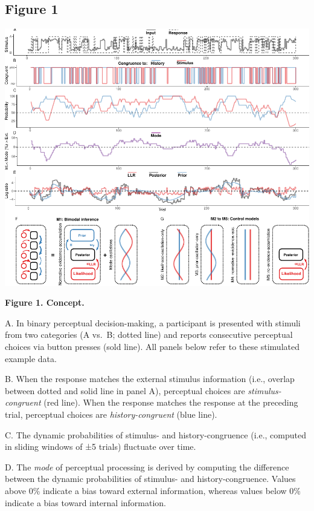 \documentclass[
]{article}
\begin{document}
\hypertarget{figure-1}{%
\subsection{Figure 1}\label{figure-1}}

\includegraphics{modes_mouse_rev1b_files/figure-latex/revised_Figure_1-1.pdf}

\textbf{Figure 1. Concept.}

A. In binary perceptual decision-making, a participant is presented with
stimuli from two categories (A vs.~B; dotted line) and reports
consecutive perceptual choices via button presses (sold line). All
panels below refer to these stimulated example data.

B. When the response matches the external stimulus information (i.e.,
overlap between dotted and solid line in panel A), perceptual choices
are \emph{stimulus-congruent} (red line). When the response matches the
response at the preceding trial, perceptual choices are
\emph{history-congruent} (blue line).

C. The dynamic probabilities of stimulus- and history-congruence (i.e.,
computed in sliding windows of ±5 trials) fluctuate over time.

D. The \emph{mode} of perceptual processing is derived by computing the
difference between the dynamic probabilities of stimulus- and
history-congruence. Values above 0\% indicate a bias toward external
information, whereas values below 0\% indicate a bias toward internal
information.
\end{document}
